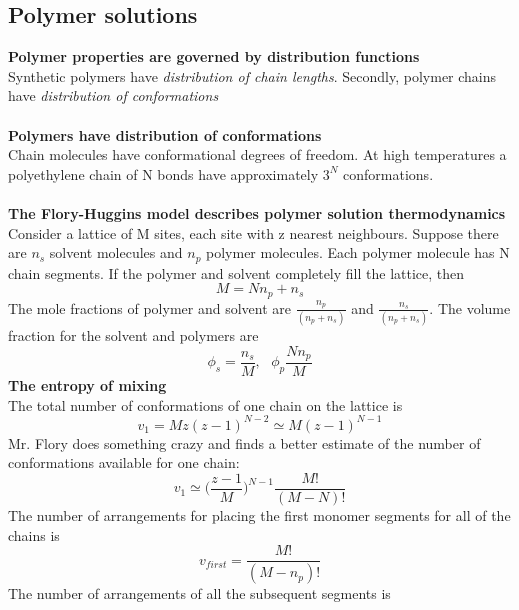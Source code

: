 \documentclass[8pt]{article}
\numberwithin{equation}{section}
\begin{document}
\begin{multicols}{2}
\section{Polymer solutions}
\textbf{Polymer properties are governed by distribution functions}\\
Synthetic polymers have \textit{distribution of chain lengths}. Secondly, polymer chains have \textit{distribution of conformations} \\ \\
\textbf{Polymers have distribution of conformations}\\ 
Chain molecules have conformational degrees of freedom. At high temperatures a polyethylene chain of N bonds have approximately $3^{N}$ conformations. \\ \\
\textbf{The Flory-Huggins model describes polymer solution thermodynamics} \\
Consider a lattice of M sites, each site with z nearest neighbours. Suppose there are $n_{s}$ solvent molecules and $n_{p}$ polymer molecules. Each polymer molecule has N chain segments. If the polymer and solvent completely fill the lattice, then 
\begin{equation}
M=Nn_{p}+n_{s} \tag{32.1}
\end{equation}
The mole fractions of polymer and solvent are $\frac{n_{p}}{(n_{p}+n_{s})}$ and $\frac{n_{s}}{(n_{p}+n_{s})}$. The volume fraction for the solvent and polymers are 
\begin{equation}
\phi_{s}=\frac{n_{s}}{M}, \ \ \ \phi_{p}\frac{Nn_{p}}{M} \tag{32.2}
\end{equation}
\textbf{The entropy of mixing} \\
The total number of conformations of one chain on the lattice is 
\begin{equation}
v_{1}=Mz(z-1)^{N-2}\simeq M(z-1)^{N-1} \tag{32.3}
\end{equation}
Mr. Flory does something crazy and finds a better estimate of the number of conformations available for one chain: 
\begin{equation}
v_{1}\simeq \bigg(\frac{z-1}{M} \bigg)^{N-1}\frac{M!}{(M-N)!} \tag{32.4}
\end{equation}
The number of arrangements for placing the first monomer segments for all of the chains is 
\begin{equation}
v_{first}=\frac{M!}{(M-n_{p})!} \tag{32.5}
\end{equation}
The number of arrangements of all the subsequent segments is 

\end{multicols}
\end{document}
